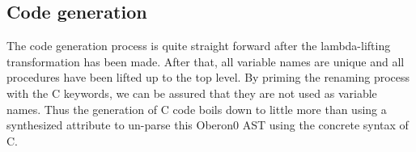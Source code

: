 \begin{comment}
\emph{To complete.}
\begin{itemize}

\item HOA used to create new, transformed, trees.

\item Two transformation merged into one pass in Oberon: renaming, and lambda lifting.

\item Renaming just threads a list of used names through the whole tree, and the
      resulting transformed tree just uses the reference attribute to find out the
      new name.

\item Lambda lifting moves all non-var declarations up to the
      top-level, in preparation for code generation.

\end{itemize}
\end{comment}


\subsection{Code generation}


The code generation process is quite straight forward after the
lambda-lifting transformation has been made.  After that, all variable
names are unique and all procedures have been lifted up to the top
level.  By priming the renaming process with the C keywords, we can be
assured that they are not used as variable names.  Thus the generation
of C code boils down to little more than using a
synthesized  attribute to un-parse this Oberon0 AST using
the concrete syntax of C.

\begin{comment}
\subsection{Artifacts (combination of tasks and sublanguages)}
\label{silver:sec:artifacts}

Stress the way that we can combine specs to create all the different
possibilities, not just the specified artifacts.

* grammar composition
* import statements
* parser specification
* build..with - a dependency on inclusion of other components.
  "It was used for problem X to include Y when Z was included."
\end{comment}

